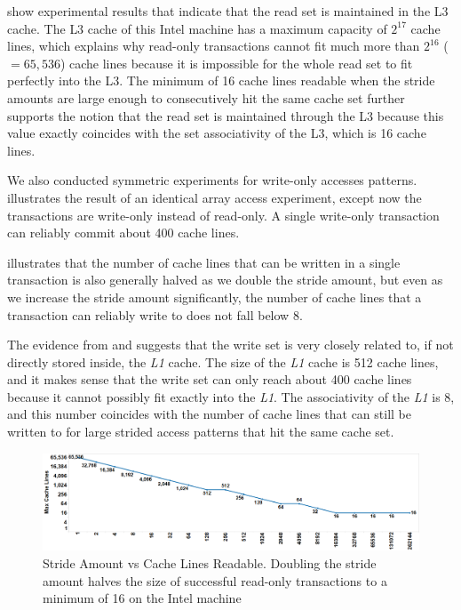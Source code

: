  show experimental results that indicate
that the read set is maintained in the
{L3} cache. The {L3} cache of this Intel machine has a maximum
capacity of $2^{17}$ cache lines, which explains why read-only transactions
cannot fit much more than $2^{16}$ ($=65,536$) cache lines because it is impossible
for the whole read set to fit perfectly into the {L3}. The minimum of 16
cache lines readable when the stride amounts are large enough to consecutively
hit the same cache set further supports the notion that the read set is
maintained through the {L3} because this value exactly coincides with the
set associativity of the {L3}, which is 16 cache lines.

We also conducted symmetric experiments for write-only accesses
patterns.   illustrates 
the result of an
identical array access experiment, except now the 
transactions are write-only
instead of read-only. A single write-only transaction 
can reliably commit about 400 cache lines.

 illustrates that the number of cache
lines that can be written in a single transaction 
is also generally halved as we
double the stride amount, but even as we increase the stride amount
significantly, the number of cache lines that a 
transaction can reliably write
to does not fall below 8.

The evidence from  and
 suggests that the write set is very
closely related to, if not directly stored inside, the \textit{L1} cache. The
size of the \textit{L1} cache is 512 cache lines, and it makes sense that the
write set can only reach about 400 cache lines because it cannot possibly fit
exactly into the \textit{L1}. The associativity of the \textit{L1} is 8, and
this number coincides with the number of cache lines that can still be written
to for large strided access patterns that hit the same cache set.

\begin{figure}[]%
\centering
\includegraphics[width=\linewidth]{images/wttm_stride_read_intel}
\caption{Stride Amount vs Cache Lines Readable. Doubling the stride amount halves the size of successful read-only
transactions to a minimum of 16 on the Intel machine}
\label{fig:wttm_stride_read_intel}
\end{figure}


